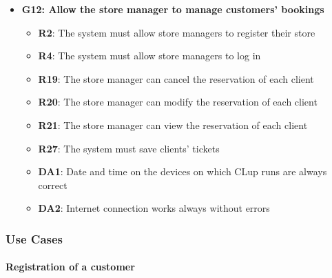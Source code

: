 \documentclass{article}
\begin{document}
\begin{itemize}
				\item {\bfseries G12: Allow the store manager to manage customers’ bookings}	

					\begin{itemize}
						\item {\bfseries R2}: The system must allow store managers to register their store
						\item {\bfseries R4}: The system must allow store managers to log in
						\item {\bfseries R19}: The store manager can cancel the reservation of each client
						\item {\bfseries R20}: The store manager can modify the reservation of each client
						\item {\bfseries R21}: The store manager can view the reservation of each client
						\item {\bfseries R27}: The system must save clients’ tickets \\
		
						\item {\bfseries DA1}: Date and time on the devices on which CLup runs are always correct
						\item {\bfseries DA2}: Internet connection works always without errors
						\newpage
		
					\end{itemize}

			\end{itemize}

		\subsubsection{Use Cases}
		

			
			\paragraph{Registration of a customer}
			
\end{document}
